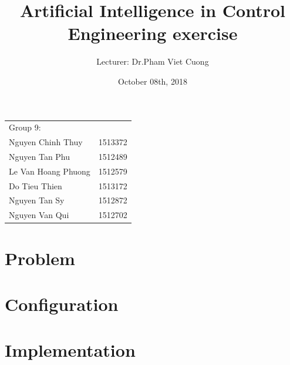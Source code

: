 \documentclass{article}
\title{Artificial Intelligence in Control Engineering exercise}
\author{
	Lecturer: Dr.Pham Viet Cuong	\\
}
\date{October 08th, 2018}
\begin{document}
\maketitle 					%

\begin{center}
	\begin{tabular}{l l}
	Group 9: \\
	Nguyen Chinh Thuy 	& 1513372	\\
	Nguyen Tan Phu		& 1512489	\\
	Le Van Hoang Phuong	& 1512579	\\
	Do Tieu Thien		& 1513172			\\
	Nguyen Tan Sy		& 1512872	\\
	Nguyen Van Qui		& 1512702
	\end{tabular}
\end{center}


\section{Problem}

\section{Configuration}

\section{Implementation}
\end{document}
